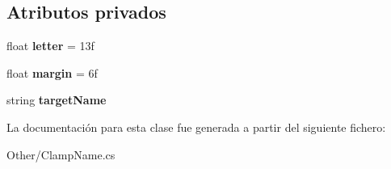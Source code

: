 \subsection*{Atributos privados}
\begin{DoxyCompactItemize}
\item 
\mbox{\label{class_clamp_name_ae08036a6866ea0bcefdfc7b632e243ac}} 
float {\bfseries letter} = 13f
\item 
\mbox{\label{class_clamp_name_a4c484e497ddd497f11e78399fc2e4e2c}} 
float {\bfseries margin} = 6f
\item 
\mbox{\label{class_clamp_name_a285c488a8f897e1b6f355a9ea79972b1}} 
string {\bfseries target\+Name}
\end{DoxyCompactItemize}


La documentación para esta clase fue generada a partir del siguiente fichero\+:\begin{DoxyCompactItemize}
\item 
Other/Clamp\+Name.\+cs\end{DoxyCompactItemize}

